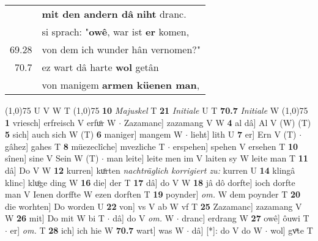 \documentclass[8pt,a4paper,notitlepage]{article}
\begin{document}
\begin{table}[ht]
\begin{minipage}[t]{0.5\linewidth}
\begin{tabular}{rl}
 & \textbf{mit den andern dâ} \textbf{niht} dranc.\\ 
 & si sprach: "\textbf{owê}, war ist \textbf{er} komen,\\ 
69.28 & von dem ich wunder hân vernomen?"\\ 
70.7 & ez wart dâ harte \textbf{wol} getân\\ 
 & von manigem \textbf{armen küenen man},\\ 
\end{tabular}
\scriptsize
\line(1,0){75} \newline
U V W T \newline
\line(1,0){75} \newline
\textbf{10} \textit{Majuskel} T  \textbf{21} \textit{Initiale} U T  \textbf{70.7} \textit{Initiale} W  \newline
\line(1,0){75} \newline
\textbf{1} vriesch] erfreisch V erfuͦr W  $\cdot$ Zazamanc] zazamang V W \textbf{4} al dâ] Al V (W) (T) \textbf{5} sich] auch sich W (T) \textbf{6} maniger] mangem W  $\cdot$ lieht] lith U \textbf{7} er] Ern V (T)  $\cdot$ gâhez] gahes T \textbf{8} müezeclîche] mvezliche T  $\cdot$ erspehen] spehen V ersehen T \textbf{10} sînen] sine V Sein W (T)  $\cdot$ man leite] leite men im V laiten sy W leite man T \textbf{11} dâ] Do V W \textbf{12} kurren] kuͦrten \textit{nachträglich korrigiert zu:} kurren U \textbf{14} klingâ klinc] kluͦge ding W \textbf{16} die] der T \textbf{17} dâ] do V W \textbf{18} jâ dô dorfte] ioch dorfte man V Ienen dorffte W ezen dorften T \textbf{19} poynder] \textit{om.} W dem poynder T \textbf{20} die worhten] Do worden U \textbf{22} von] vs V ab W vf T \textbf{25} Zazamanc] zazamang V W \textbf{26} mit] Do mit W bi T  $\cdot$ dâ] do V \textit{om.} W  $\cdot$ dranc] erdrang W \textbf{27} owê] ôuwi T  $\cdot$ er] \textit{om.} T \textbf{28} ich] ich hie W \textbf{70.7} wart] was W  $\cdot$ dâ] [*]: do V do W  $\cdot$ wol] gvͦte T \newline
\end{minipage}
\end{table}
\end{document}
